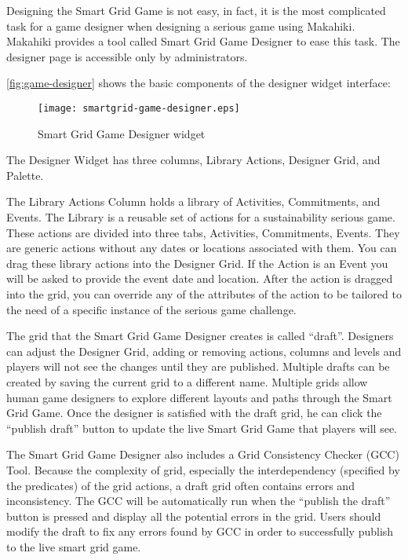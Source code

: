 Designing the Smart Grid Game is not easy, in fact, it is the most complicated task for a game designer when designing a serious game using Makahiki. Makahiki provides a tool called Smart Grid Game Designer to ease this task. The designer page is accessible only by administrators. 

\autoref{fig:game-designer} shows the basic components of the designer widget interface:

\begin{figure}[!ht]
  \center
  \texttt{[image: smartgrid-game-designer.eps]}
  \caption{Smart Grid Game Designer widget}
  \label{fig:game-designer}
\end{figure}

The Designer Widget has three columns, Library Actions, Designer Grid, and Palette. 

The Library Actions Column holds a library of Activities, Commitments, and Events. The Library is a reusable set of actions for a sustainability serious game. These actions are divided into three tabs, Activities, Commitments, Events. They are generic actions without any dates or locations associated with them. You can drag these library actions into the Designer Grid. If the Action is an Event you will be asked to provide the event date and location. After the action is dragged into the grid, you can override any of the attributes of the action to be tailored to the need of a specific instance of the serious game challenge.
 
The grid that the Smart Grid Game Designer creates is called ``draft''. Designers can adjust the Designer Grid, adding or removing actions, columns and levels and players will not see the changes until they are published. Multiple drafts can be created by saving the current grid to a different name. Multiple grids allow human game designers to explore different layouts and paths through the Smart Grid Game. Once the designer is satisfied with the draft grid, he can click the ``publish draft'' button to update the live Smart Grid Game that players will see.

The Smart Grid Game Designer also includes a Grid Consistency Checker (GCC) Tool. Because the complexity of grid, especially the interdependency (specified by the predicates) of the grid actions, a draft grid often contains errors and inconsistency. The GCC will be automatically run when the ``publish the draft'' button is pressed and display all the potential errors in the grid. Users should modify the draft to fix any errors found by GCC in order to successfully publish to the live smart grid game. 

